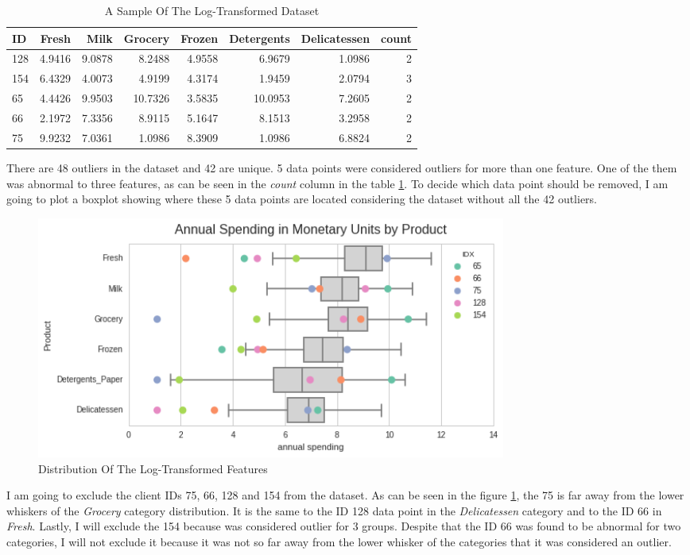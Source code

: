 \documentclass[a4paper]{article}
\begin{document}
\begin{table}[ht!]
\centering
\begin{tabular}{l|rrrrrrr}
{ID} &    Fresh &     Milk &  Grocery &    Frozen & Detergents & Delicatessen & count \\\hline
128 &  4.9416 &  9.0878 &   8.2488 &  4.9558 &          6.9679 &      1.0986 &      2 \\
154 &  6.4329 &  4.0073 &   4.9199 &  4.3174 &          1.9459 &      2.0794 &      3 \\
65  &  4.4426 &  9.9503 &  10.7326 &  3.5835 &         10.0953 &      7.2605 &      2 \\
66  &  2.1972 &  7.3356 &   8.9115 &  5.1647 &          8.1513 &      3.2958 &      2 \\
75  &  9.9232 &  7.0361 &   1.0986 &  8.3909 &          1.0986 &      6.8824 &      2 \\

\end{tabular}
\caption{\label{tab:outliers}A Sample Of The Log-Transformed Dataset}
\end{table}

There are 48 outliers in the dataset and 42 are unique. 5 data points were considered outliers for more than one feature. One of the them was abnormal to three features, as can be seen in the \textit{count} column in the table \ref{tab:outliers}. To decide which data point should be removed, I am going to plot a boxplot showing where these 5 data points are located considering the dataset without all the 42 outliers.

\begin{figure}[ht!]
\centering
\includegraphics[width=0.75\textwidth]{figures/boxplot_features_log.png}
\caption{\label{fig:log_boxplot}Distribution Of The Log-Transformed Features}
\end{figure}

I am going to exclude the client IDs 75, 66, 128 and 154 from the dataset. As can be seen in the figure \ref{fig:log_boxplot}, the 75 is far away from the lower whiskers of the \textit{Grocery} category distribution. It is the same to the ID 128 data point in the \textit{Delicatessen} category and to the ID 66 in \textit{Fresh}. Lastly, I will exclude the 154 because was considered outlier for 3 groups. Despite that the ID 66 was found to be abnormal for two categories, I will not exclude it because it was not so far away from the lower whisker of the categories that it was considered an outlier.
\end{document}
